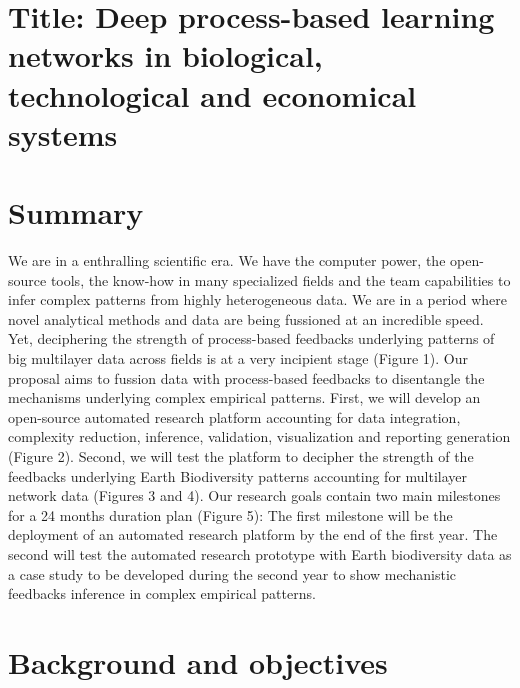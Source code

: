 \documentclass[authoryear,1p,12pt]{elsarticle}
\begin{document}
\section{{\bf Title: Deep process-based learning networks in biological, technological and economical systems}}

\section{{\bf Summary}}
We are in a enthralling scientific era. We have the computer power,
the open-source tools, the know-how in many specialized fields and the
team capabilities to infer complex patterns from highly heterogeneous
data. We are in a period where novel analytical methods and data are
being fussioned at an incredible speed. Yet, deciphering the strength
of process-based feedbacks underlying patterns of big multilayer data
across fields is at a very incipient stage (Figure 1). Our proposal
aims to fussion data with process-based feedbacks to disentangle the
mechanisms underlying complex empirical patterns. First, we will
develop an open-source automated research platform accounting for data
integration, complexity reduction, inference, validation,
visualization and reporting generation (Figure 2). Second, we will
test the platform to decipher the strength of the feedbacks underlying
Earth Biodiversity patterns accounting for multilayer network data
(Figures 3 and 4). Our research goals contain two main milestones for
a 24 months duration plan (Figure 5): The first milestone will be the
deployment of an automated research platform by the end of the first
year. The second will test the automated research prototype with Earth
biodiversity data as a case study to be developed during the second
year to show mechanistic feedbacks inference in complex empirical
patterns.

\newpage

\section{Background and objectives}
\end{document}
